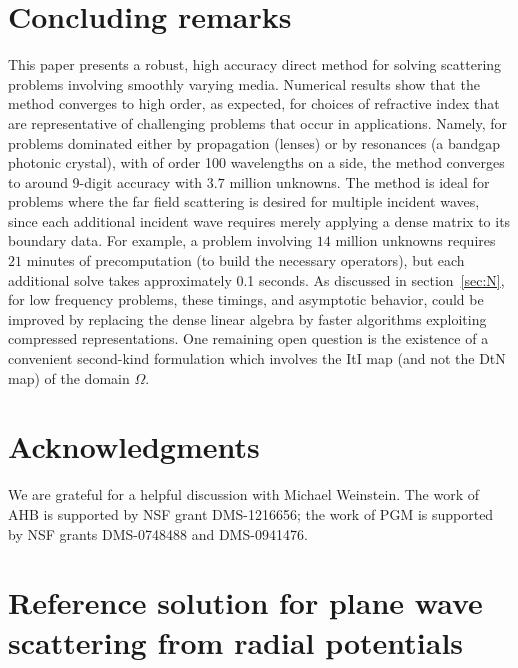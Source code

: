 \documentclass[11pt,final]{amsart}
\theoremstyle{definition}
\numberwithin{remark}{section}
\numberwithin{definition}{section}
\numberwithin{pro}{section}
\begin{document}
\section{Concluding remarks}

This paper presents a robust, high accuracy direct method for solving
scattering problems involving smoothly varying media.
Numerical results show that the method converges to high order,
as expected, for choices of refractive index that are representative
of challenging problems that occur in applications.  Namely, for
problems dominated either by propagation (lenses) or by resonances
(a bandgap photonic crystal),
with of order 100 wavelengths on a side, the method converges to around 9-digit
accuracy with $3.7$ million unknowns.
The method is ideal for
problems where the far field scattering is desired for multiple incident
waves, since each additional incident wave requires merely applying a
dense matrix to its boundary data.
For example, a problem involving $14$ million unknowns
requires $21$ minutes of precomputation (to build the necessary operators),
but each additional solve takes approximately 0.1 seconds.
As discussed in section~\ref{sec:N}, for
low frequency problems,
these timings, and asymptotic behavior, could be improved
by replacing the dense linear algebra by faster algorithms exploiting
compressed representations.
%
One remaining open question is the existence of a convenient second-kind formulation which
involves the ItI map (and not the DtN map) of the domain $\Omega$.

\section*{Acknowledgments}

We are grateful for a helpful discussion with Michael Weinstein.
The work of AHB is supported by NSF grant DMS-1216656;
the work of PGM is supported by NSF grants DMS-0748488 and DMS-0941476.

\appendix

\section{Reference solution for plane wave scattering from radial potentials}
\label{s:ref}
\end{document}
